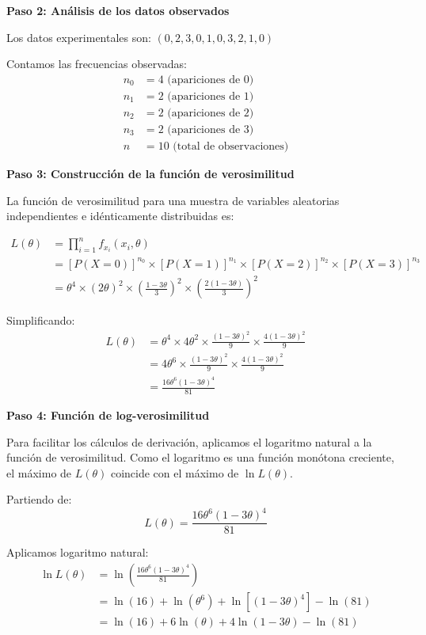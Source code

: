 \documentclass[11pt,a4paper]{article}
\begin{document}
\textbf{Paso 2: Análisis de los datos observados}

Los datos experimentales son: $(0, 2, 3, 0, 1, 0, 3, 2, 1, 0)$

Contamos las frecuencias observadas:
\begin{align*}
n_0 &= 4 \text{ (apariciones de 0)} \\
n_1 &= 2 \text{ (apariciones de 1)} \\
n_2 &= 2 \text{ (apariciones de 2)} \\
n_3 &= 2 \text{ (apariciones de 3)} \\
n &= 10 \text{ (total de observaciones)}
\end{align*}

\textbf{Paso 3: Construcción de la función de verosimilitud}

La función de verosimilitud para una muestra de variables aleatorias independientes e idénticamente distribuidas es:

\begin{align*}
L(\theta) &= \prod_{i=1}^{n} f_{x_i}(x_i, \theta) \\
&= [P(X=0)]^{n_0} \times [P(X=1)]^{n_1} \times [P(X=2)]^{n_2} \times [P(X=3)]^{n_3} \\
&= \theta^4 \times (2\theta)^2 \times \left(\frac{1-3\theta}{3}\right)^2 \times \left(\frac{2(1-3\theta)}{3}\right)^2
\end{align*}

Simplificando:
\begin{align*}
L(\theta) &= \theta^4 \times 4\theta^2 \times \frac{(1-3\theta)^2}{9} \times \frac{4(1-3\theta)^2}{9} \\
&= 4\theta^6 \times \frac{(1-3\theta)^2}{9} \times \frac{4(1-3\theta)^2}{9} \\
&= \frac{16\theta^6(1-3\theta)^4}{81}
\end{align*}

\textbf{Paso 4: Función de log-verosimilitud}

Para facilitar los cálculos de derivación, aplicamos el logaritmo natural a la función de verosimilitud. Como el logaritmo es una función monótona creciente, el máximo de $L(\theta)$ coincide con el máximo de $\ln L(\theta)$.

Partiendo de:
\[
L(\theta) = \frac{16\theta^6(1-3\theta)^4}{81}
\]

Aplicamos logaritmo natural:
\begin{align*}
\ln L(\theta) &= \ln\left(\frac{16\theta^6(1-3\theta)^4}{81}\right) \\
&= \ln(16) + \ln(\theta^6) + \ln[(1-3\theta)^4] - \ln(81) \\
&= \ln(16) + 6\ln(\theta) + 4\ln(1-3\theta) - \ln(81)
\end{align*}
\end{document}
